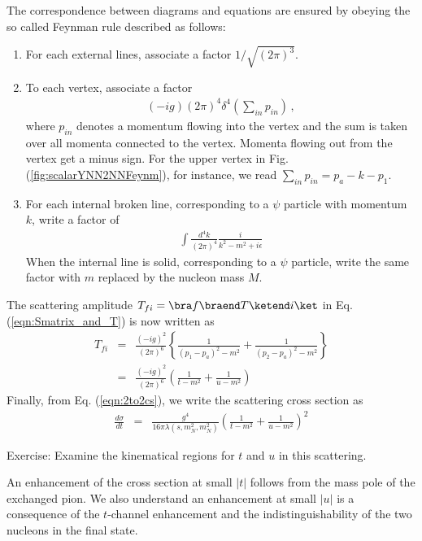The correspondence between diagrams and equations are ensured by obeying
the so called Feynman rule described as follows:

\begin{enumerate}
\item For each external lines, associate a factor $1/\sqrt{(2\pi)^3}$.

\item To each vertex, associate a factor
\begin{eqnarray}
(-ig) (2\pi)^4 \delta^4(\sum_{in} p_{in})\,,
\end{eqnarray}
where $p_{in}$ denotes a momentum flowing into the vertex and the sum is taken
over all momenta connected to the vertex. Momenta flowing out from the vertex get
a minus sign. For the upper vertex in Fig. (\ref{fig:scalarYNN2NNFeynm}), for instance,
we read $\sum_{in} p_{in} = p_a - k - p_1$.

\item For each internal broken line, corresponding to a $\psi$ particle with momentum $k$,
write a factor of
\begin{eqnarray}
\int \frac{d^4 k}{(2\pi)^4} \frac{i}{k^2 - m^2 + i\epsilon}
\end{eqnarray}
When the internal line is solid, corresponding to a $\psi$ particle, write the same factor
with $m$ replaced by the nucleon mass $M$.
\end{enumerate}

The scattering amplitude $T_{fi} = \bra f \braend T \ketend i \ket$ 
in Eq. (\ref{eqn:Smatrix_and_T}) is now
written as
\begin{eqnarray}
T_{fi}
&=&
\frac{(-i g)^2}{(2\pi)^6} 
\left\{
\frac{1}{(p_1 - p_a)^2 - m^2}
+
\frac{1}{(p_2 - p_a)^2 - m^2}
\right\}
\nonumber\\
&=&
\frac{(-i g)^2}{(2\pi)^6} 
\left(
\frac{1}{t - m^2}
+
\frac{1}{u - m^2}
\right)
\end{eqnarray}
Finally, from Eq. (\ref{eqn:2to2cs}), we write the scattering cross section as
\begin{eqnarray}
\frac{d \sigma}{dt}
&=&
\frac{g^4}{16\pi \lambda(s, m_N^2,m_N^2)}
\left(
\frac{1}{t - m^2} + \frac{1}{u - m^2}
\right)^2
\end{eqnarray}

\bigskip

Exercise\theexercise:
Examine the kinematical regions for $t$ and $u$ in this scattering.

\bigskip

An enhancement of the cross section at small $|t|$ follows from the mass pole
of the exchanged pion. We also understand an enhancement at small $|u|$ is
a consequence of  the $t$-channel enhancement and the indistinguishability of
the two nucleons in the final state.


